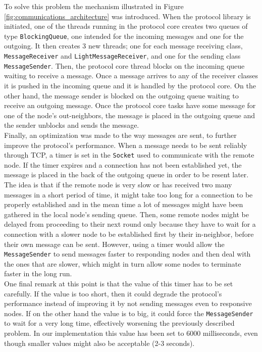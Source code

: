 \documentclass[a4paper,11pt,twoside]{report}
\newcommand{\classname}[1]{\texttt{#1}}
\begin{document}
To solve this problem the mechanism illustrated in Figure \ref{fig:communications_architecture} was introduced. When the protocol library is initiated, one of the threads running in the protocol core creates two queues of type \classname{BlockingQueue}, one intended for the incoming messages and one for the outgoing. It then creates 3 new threads; one for each message receiving class, \classname{MessageReceiver} and \classname{LightMessageReceiver}, and one for the sending class \classname{MessageSender}. Then, the protocol core thread blocks on the incoming queue waiting to receive a message. Once a message arrives to any of the receiver classes it is pushed in the incoming queue and it is handled by the protocol core. On the other hand, the message sender is blocked on the outgoing queue waiting to receive an outgoing message. Once the protocol core tasks have some message for one of the node's out-neighbors, the message is placed in the outgoing queue and the sender unblocks and sends the message.\\

Finally, an optimization was made to the way messages are sent, to further improve the protocol's performance. When a message needs to be sent reliably through TCP, a timer is set in the \classname{Socket} used to communicate with the remote node. If the timer expires and a connection has not been established yet, the message is placed in the back of the outgoing queue in order to be resent later. The idea is that if the remote node is very slow or has received two many messages in a short period of time, it might take too long for a connection to be properly established and in the mean time a lot of messages might have been gathered in the local node's sending queue. Then, some remote nodes might be delayed from proceeding to their next round only because they have to wait for a connection with a slower node to be established first by their in-neighbor, before their own message can be sent. However, using a timer would allow the \classname{MessageSender} to send messages faster to responding nodes and then deal with the ones that are slower, which might in turn allow some nodes to terminate faster in the long run.\\

One final remark at this point is that the value of this timer has to be set carefully. If the value is too short, then it could degrade the protocol's performance instead of improving it by not sending messages even to responsive nodes. If on the other hand the value is to big, it could force the \classname{MessageSender} to wait for a very long time, effectively worsening the previously described problem. In our implementation this value has been set to 6000 milliseconds, even though smaller values might also be acceptable (2-3 seconds). 
\end{document}
